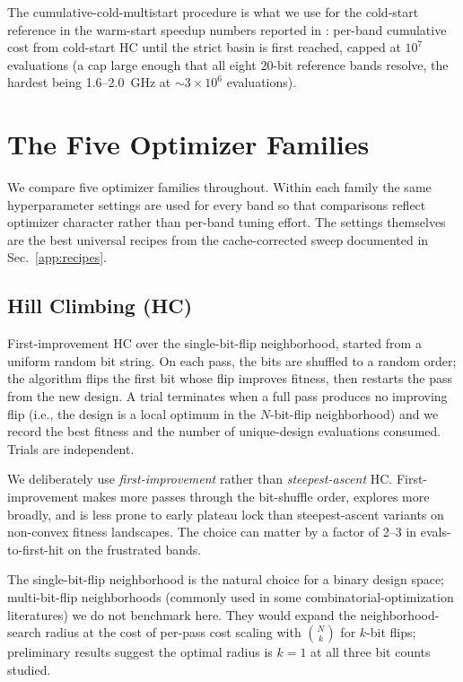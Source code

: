 The cumulative-cold-multistart procedure is what we use for the
cold-start reference in the warm-start speedup numbers reported in
\cite{Maloney2026Paper1}: per-band cumulative cost from cold-start
HC until the strict basin is first reached, capped at $10^7$
evaluations (a cap large enough that all eight 20-bit reference
bands resolve, the hardest being 1.6--2.0~GHz at $\sim\!3 \times
10^6$ evaluations).

\section{The Five Optimizer Families}
\label{app:methods}

We compare five optimizer families throughout. Within each family
the same hyperparameter settings are used for every band so that
comparisons reflect optimizer character rather than per-band
tuning effort. The settings themselves are the best universal
recipes from the cache-corrected sweep documented in
Sec.~\ref{app:recipes}.

\subsection{Hill Climbing (HC)}

First-improvement HC over the single-bit-flip neighborhood, started
from a uniform random bit string. On each pass, the bits are
shuffled to a random order; the algorithm flips the first bit whose
flip improves fitness, then restarts the pass from the new design.
A trial terminates when a full pass produces no improving flip
(i.e., the design is a local optimum in the $N$-bit-flip
neighborhood) and we record the best fitness and the number of
unique-design evaluations consumed. Trials are independent.

We deliberately use \emph{first-improvement} rather than
\emph{steepest-ascent} HC. First-improvement makes more passes
through the bit-shuffle order, explores more broadly, and is less
prone to early plateau lock than steepest-ascent variants on
non-convex fitness landscapes. The choice can matter by a factor
of 2--3 in evals-to-first-hit on the frustrated bands.

The single-bit-flip neighborhood is the natural choice for a binary
design space; multi-bit-flip neighborhoods (commonly used in some
combinatorial-optimization literatures) we do not benchmark here.
They would expand the neighborhood-search radius at the cost of
per-pass cost scaling with $\binom{N}{k}$ for $k$-bit flips;
preliminary results suggest the optimal radius is $k = 1$ at all
three bit counts studied.

